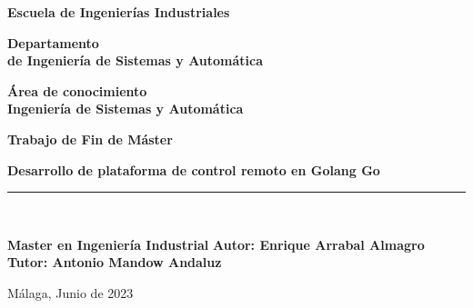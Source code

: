 \begin{center}
	\begin{large}
		\textbf {Escuela de Ingenierías Industriales\\}
	\end{large}	
	\vspace*{0.5cm}
	\begin{large}
		\textbf {Departamento\\ de Ingeniería de Sistemas y Automática\\}
	\end{large}	
	\vspace*{1cm}
	\begin{large}
		\textbf {Área de conocimiento\\Ingeniería de Sistemas y Automática\\}
	\end{large}	
	\vspace*{1cm}	
	\begin{Huge}
		\textbf {Trabajo de Fin de Máster\\}
	\end{Huge}
	\vspace*{0.3cm}
	\begin{LARGE}
		\textbf {Desarrollo de plataforma de control remoto en Golang Go\\}
	\end{LARGE}
	\vspace*{0.3cm}
	\rule{5cm}{0.01cm}\\
	\vspace*{1cm}
	\begin{large}
		\textbf{Master en Ingeniería Industrial}
		\vspace*{0.5cm}
		\textbf {Autor: Enrique Arrabal Almagro\\}
		\vspace*{1cm}
		\textbf {Tutor: Antonio Mandow Andaluz\\}
	\end{large}
	\vspace*{3cm}
\begin{center}
\textbf{}{Málaga, Junio de 2023}
\end{center}					
\end{center}
\thispagestyle{empty}

